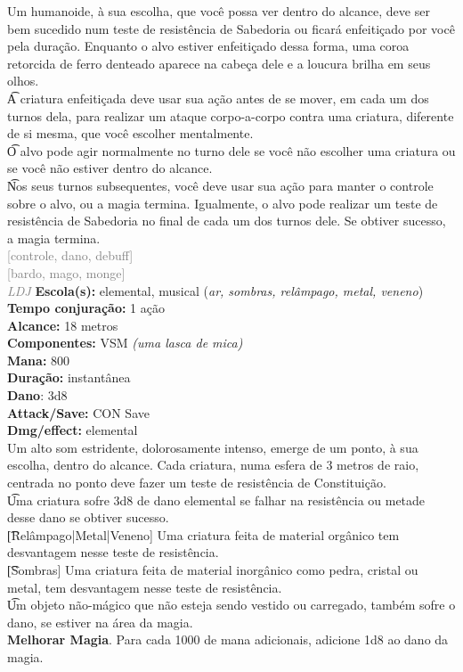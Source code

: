 \documentclass{RPG_Adventure}[2021/10/20]
\begin{document}
{\normalsize Um humanoide, à sua escolha, que você possa ver dentro do alcance, deve ser bem sucedido num teste de resistência de Sabedoria ou ficará enfeitiçado por você pela duração. Enquanto o alvo estiver enfeitiçado dessa forma, uma coroa retorcida de ferro denteado aparece na cabeça dele e a loucura brilha em seus olhos.\\\t A criatura enfeitiçada deve usar sua ação antes de se mover, em cada um dos turnos dela, para realizar um ataque corpo-a-corpo contra uma criatura, diferente de si mesma, que você escolher mentalmente.\\\t O alvo pode agir normalmente no turno dele se você não escolher uma criatura ou se você não estiver dentro do alcance.\\\t Nos seus turnos subsequentes, você deve usar sua ação para manter o controle sobre o alvo, ou a magia termina. Igualmente, o alvo pode realizar um teste de resistência de Sabedoria no final de cada um dos turnos dele. Se obtiver sucesso, a magia termina.\\}
{\scriptsize \textcolor{gray}{[controle, dano, debuff]\\}}
{\scriptsize \textcolor{gray}{[bardo, mago, monge]\\}}
{\tiny \textcolor{gray}{\textit{LDJ}}}\jump{}
{\small \t \textbf{Escola(s):} elemental, musical (\textit{ar, sombras, relâmpago, metal, veneno})\\\t \textbf{Tempo conjuração:} 1 ação\\\t \textbf{Alcance:} 18 metros\\\t \textbf{Componentes:} VSM \textit{(uma lasca de mica)}\\\t \textbf{Mana:} 800\\\t \textbf{Duração:} instantânea\\\t \textbf{Dano}: 3d8\\\t \textbf{Attack/Save:} CON Save\\\t \textbf{Dmg/effect:} elemental\\}
{\normalsize Um alto som estridente, dolorosamente intenso, emerge de um ponto, à sua escolha, dentro do alcance. Cada criatura, numa esfera de 3 metros de raio, centrada no ponto deve fazer um teste de resistência de Constituição.\\\t Uma criatura sofre 3d8 de dano elemental se falhar na resistência ou metade desse dano se obtiver sucesso.\\\t [Relâmpago|Metal|Veneno] Uma criatura feita de material orgânico tem desvantagem nesse teste de resistência.\\\t [Sombras] Uma criatura feita de material inorgânico como pedra, cristal ou metal, tem desvantagem nesse teste de resistência.\\\t Um objeto não-mágico que não esteja sendo vestido ou carregado, também sofre o dano, se estiver na área da magia.\\\t \textbf{Melhorar Magia}. Para cada 1000 de mana adicionais, adicione 1d8 ao dano da magia.\\}
\end{document}
